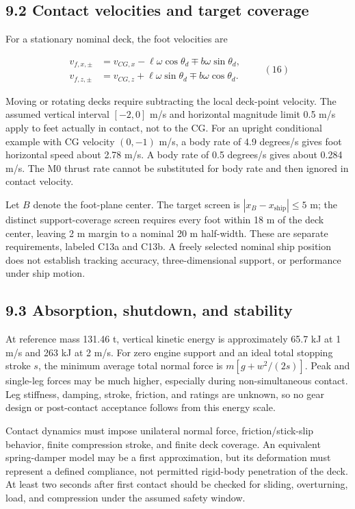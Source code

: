 \documentclass[
  11pt,
  a4paper,
]{article}
\begin{document}
\subsection{9.2 Contact velocities and target
coverage}\label{contact-velocities-and-target-coverage}

For a stationary nominal deck, the foot velocities are

\[
\begin{aligned}
v_{f,x,\pm}&=v_{CG,x}-\ell\omega\cos\theta_d\mp b\omega\sin\theta_d,\\
v_{f,z,\pm}&=v_{CG,z}+\ell\omega\sin\theta_d\mp b\omega\cos\theta_d.
\end{aligned}\qquad (16)
\]

Moving or rotating decks require subtracting the local deck-point
velocity. The assumed vertical interval \([-2,0]\) m/s and horizontal
magnitude limit 0.5 m/s apply to feet actually in contact, not to the
CG. For an upright conditional example with CG velocity \((0,-1)\) m/s,
a body rate of 4.9 degrees/s gives foot horizontal speed about 2.78 m/s.
A body rate of 0.5 degrees/s gives about 0.284 m/s. The M0 thrust rate
cannot be substituted for body rate and then ignored in contact
velocity.

Let \(B\) denote the foot-plane center. The target screen is
\(|x_B-x_{\mathrm{ship}}|\le5\) m; the distinct support-coverage screen
requires every foot within 18 m of the deck center, leaving 2 m margin
to a nominal 20 m half-width. These are separate requirements, labeled
C13a and C13b. A freely selected nominal ship position does not
establish tracking accuracy, three-dimensional support, or performance
under ship motion.

\subsection{9.3 Absorption, shutdown, and
stability}\label{absorption-shutdown-and-stability}

At reference mass 131.46 t, vertical kinetic energy is approximately
65.7 kJ at 1 m/s and 263 kJ at 2 m/s. For zero engine support and an
ideal total stopping stroke \(s\), the minimum average total normal
force is \(m[g+w^2/(2s)]\). Peak and single-leg forces may be much
higher, especially during non-simultaneous contact. Leg stiffness,
damping, stroke, friction, and ratings are unknown, so no gear design or
post-contact acceptance follows from this energy scale.

Contact dynamics must impose unilateral normal force,
friction/stick-slip behavior, finite compression stroke, and finite deck
coverage. An equivalent spring-damper model may be a first
approximation, but its deformation must represent a defined compliance,
not permitted rigid-body penetration of the deck. At least two seconds
after first contact should be checked for sliding, overturning, load,
and compression under the assumed safety window.
\end{document}
